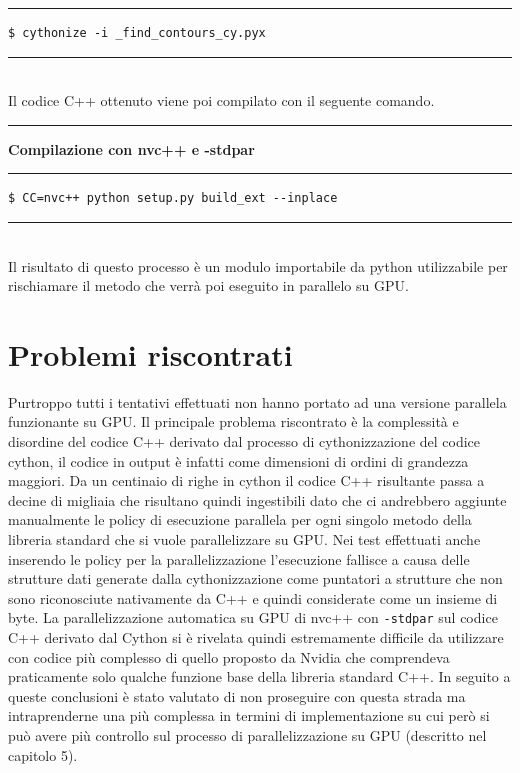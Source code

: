 \documentclass[12pt,a4paper]{report}
\begin{document}
\noindent\rule[0.5ex]{\linewidth}{1pt}
\begin{lstlisting}
$ cythonize -i _find_contours_cy.pyx
\end{lstlisting}
\noindent\rule[0.5ex]{\linewidth}{1pt} \\[8pt]
Il codice C++ ottenuto viene poi compilato con il seguente comando.\\[8pt]
\noindent\rule[0.5ex]{\linewidth}{2pt}
\small{\textbf{Compilazione con nvc++ e -stdpar}} \\
\noindent\rule[0.5ex]{\linewidth}{1pt}
\begin{lstlisting}
$ CC=nvc++ python setup.py build_ext --inplace
\end{lstlisting}
\noindent\rule[0.5ex]{\linewidth}{1pt} \\[10pt]
Il risultato di questo processo è un modulo importabile da python utilizzabile per rischiamare il metodo che verrà poi eseguito in parallelo su GPU. \newline 

\section{Problemi riscontrati}
Purtroppo tutti i tentativi effettuati non hanno portato ad una versione parallela funzionante su GPU. Il principale problema riscontrato è la complessità e disordine del codice C++ derivato dal processo di cythonizzazione del codice cython, il codice in output è infatti come dimensioni di ordini di grandezza maggiori. Da un centinaio di righe in cython il codice C++ risultante passa a decine di migliaia che risultano quindi ingestibili dato che ci andrebbero aggiunte manualmente le policy di esecuzione parallela per ogni singolo metodo della libreria standard che si vuole parallelizzare su GPU. Nei test effettuati anche inserendo le policy per la parallelizzazione l'esecuzione fallisce a causa delle strutture dati generate dalla cythonizzazione come puntatori a strutture che non sono riconosciute nativamente da C++ e quindi considerate come un insieme di byte. La parallelizzazione automatica su GPU di nvc++ con \verb|-stdpar| sul codice C++ derivato dal Cython si è rivelata quindi estremamente difficile da utilizzare con codice più complesso di quello proposto da Nvidia che comprendeva praticamente solo qualche funzione base della libreria standard C++. \newline
In seguito a queste conclusioni è stato valutato di non proseguire con questa strada ma intraprenderne una più complessa in termini di implementazione su cui però si può avere più controllo sul processo di parallelizzazione su GPU (descritto nel capitolo 5).
\end{document}
